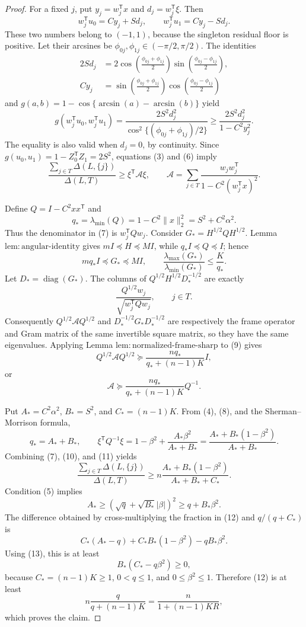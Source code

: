 \documentclass{article}
\begin{document}
\begin{proof}
For a fixed \(j\), put \(y_j=w_j^{\mathsf T}x\) and \(d_j=w_j^{\mathsf T}\xi\).  Then
\[
 w_j^{\mathsf T}u_0=Cy_j+Sd_j,\qquad
 w_j^{\mathsf T}u_1=Cy_j-Sd_j.
\]
These two numbers belong to \((-1,1)\), because the singleton residual floor is positive.  Let their arcsines be \(\phi_{0j},\phi_{1j}\in(-\pi/2,\pi/2)\).  The identities
\[
\begin{aligned}
 2Sd_j
 &=2\cos\!\left(\frac{\phi_{0j}+\phi_{1j}}2\right)
      \sin\!\left(\frac{\phi_{0j}-\phi_{1j}}2\right),\\
 Cy_j
 &=\sin\!\left(\frac{\phi_{0j}+\phi_{1j}}2\right)
      \cos\!\left(\frac{\phi_{0j}-\phi_{1j}}2\right)
\end{aligned}
\]
and \(g(a,b)=1-\cos\{\arcsin(a)-\arcsin(b)\}\) yield
\[
 g(w_j^{\mathsf T}u_0,w_j^{\mathsf T}u_1)
 =\frac{2S^2d_j^2}{\cos^2\{(\phi_{0j}+\phi_{1j})/2\}}
 \ge\frac{2S^2d_j^2}{1-C^2y_j^2}. \tag{6}
\]
The equality is also valid when \(d_j=0\), by continuity.  Since
\(g(u_0,u_1)=1-Z_0^{\mathsf T}Z_1=2S^2\), equations (3) and (6) imply
\[
 \frac{\sum_{j\in T}\Delta(L,\{j\})}{\Delta(L,T)}
 \ge \xi^{\mathsf T}\mathcal A\xi,\qquad
 \mathcal A=\sum_{j\in T}
 \frac{w_jw_j^{\mathsf T}}{1-C^2(w_j^{\mathsf T}x)^2}. \tag{7}
\]

Define \(Q=I-C^2xx^{\mathsf T}\) and
\[
 q_*=\lambda_{\min}(Q)=1-C^2\|x\|_2^2=S^2+C^2\alpha^2. \tag{8}
\]
Thus the denominator in (7) is \(w_j^{\mathsf T}Qw_j\).  Consider
\(G_*=H^{1/2}QH^{1/2}\).  Lemma \(\mathrm{lem{:}angular\text{-}identity}\) gives \(mI\preceq H\preceq MI\), while \(q_*I\preceq Q\preceq I\); hence
\[
 mq_*I\preceq G_*\preceq MI,\qquad
 \frac{\lambda_{\max}(G_*)}{\lambda_{\min}(G_*)}\le\frac{K}{q_*}. \tag{9}
\]
Let \(D_* =\operatorname{diag}(G_*)\).  The columns of
\(Q^{1/2}H^{1/2}D_*^{-1/2}\) are exactly
\[
 \frac{Q^{1/2}w_j}{\sqrt{w_j^{\mathsf T}Qw_j}},\qquad j\in T.
\]
Consequently \(Q^{1/2}\mathcal A Q^{1/2}\) and
\(D_*^{-1/2}G_*D_*^{-1/2}\) are respectively the frame operator and Gram matrix of the same invertible square matrix, so they have the same eigenvalues.  Applying Lemma \(\mathrm{lem{:}normalized\text{-}frame\text{-}sharp}\) to (9) gives
\[
 Q^{1/2}\mathcal A Q^{1/2}
 \succeq\frac{nq_*}{q_*+(n-1)K}I,
\]
or
\[
 \mathcal A\succeq\frac{nq_*}{q_*+(n-1)K}Q^{-1}. \tag{10}
\]

Put \(A_*=C^2\alpha^2\), \(B_*=S^2\), and \(C_*=(n-1)K\).  From (4), (8), and the Sherman--Morrison formula,
\[
 q_*=A_*+B_*,
 \qquad
 \xi^{\mathsf T}Q^{-1}\xi
 =1-\beta^2+\frac{A_*\beta^2}{A_*+B_*}
 =\frac{A_*+B_*(1-\beta^2)}{A_*+B_*}. \tag{11}
\]
Combining (7), (10), and (11) yields
\[
 \frac{\sum_{j\in T}\Delta(L,\{j\})}{\Delta(L,T)}
 \ge n\frac{A_*+B_*(1-\beta^2)}{A_*+B_*+C_*}. \tag{12}
\]
Condition (5) implies
\[
 A_*\ge(\sqrt q+\sqrt{B_*}|\beta|)^2\ge q+B_*\beta^2. \tag{13}
\]
The difference obtained by cross-multiplying the fraction in (12) and \(q/(q+C_*)\) is
\[
 C_*(A_*-q)+C_*B_*(1-\beta^2)-qB_*\beta^2.
\]
Using (13), this is at least
\[
 B_*(C_*-q\beta^2)\ge0,
\]
because \(C_*=(n-1)K\ge1\), \(0<q\le1\), and \(0\le\beta^2\le1\).  Therefore (12) is at least
\[
 n\frac{q}{q+(n-1)K}=\frac{n}{1+(n-1)KR},
\]
which proves the claim.
\end{proof}
\end{document}
